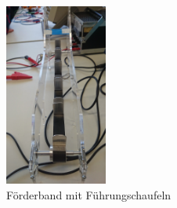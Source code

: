 \begin{figure}[h!]
	\includegraphics[width=0.3\textwidth,clip,trim=0cm 0cm 0cm 0cm]
	{Testberichte/Fuehrungsschaufel.jpg}
	\centering
	\caption{Förderband mit Führungschaufeln}
	\label{abb:Führungsschaufel}
\end{figure}


